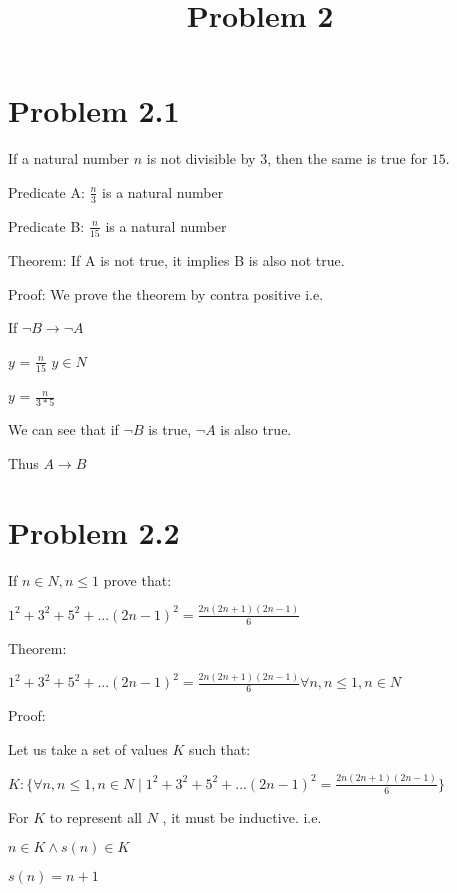 \documentclass{article}
\begin{document}
	
    \title{\textbf{Problem 2}}
    \maketitle
    \section{\textbf{Problem 2.1}}
        If a natural number $n$ is not divisible by $3$, then the same is true for $15$.
        
        Predicate A: $\frac{n}{3}$ is a natural number
        
        Predicate B: $\frac{n}{15}$ is a natural number
        
        Theorem: If A is not true, it implies B is also not true.
        
        Proof:
            We prove the theorem by contra positive i.e.
        
            If $\neg B \longrightarrow \neg A$

            $y$ = $\frac{n}{15}$ $y \in N$

            $y$ = $\frac{n}{3 * 5}$

            We can see that if $\neg B$ is true, $\neg A$ is also true.

            Thus $A \longrightarrow B$

    \section{\textbf{Problem 2.2}}
        If $n \in N , n \leq 1$ prove that:
        
        $ 1^2 + 3^2 + 5^2 + ...(2n -1)^2 = \frac{2n(2n + 1)(2n -1)}{6} $

        Theorem: 

        $ 1^2 + 3^2 + 5^2 + ...(2n -1)^2 = \frac{2n(2n + 1)(2n -1)}{6} \forall n, n \leq 1, n \in N$

        Proof:

            Let us take a set of values $K$ such that:

            $K : \{ \forall n, n \leq 1, n \in N \mid 1^2 + 3^2 + 5^2 + ...(2n -1)^2 = \frac{2n(2n + 1)(2n -1)}{6}\}$

            For $K$ to represent all $N$ , it must be inductive. i.e.

            $n \in K \land s(n) \in K $

            $s(n) = n + 1$
\end{document}
